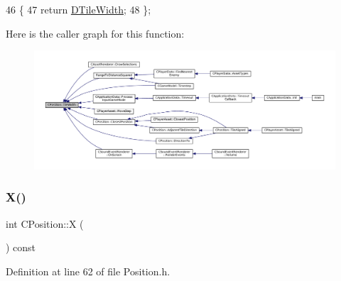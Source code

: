 \begin{DoxyCode}
46                               \{
47             \textcolor{keywordflow}{return} \hyperlink{classCPosition_ac17d12fb5d35fcf62d63bb42e8cf7ed6}{DTileWidth};  
48         \};
\end{DoxyCode}
Here is the caller graph for this function\+:\nopagebreak
\begin{figure}[H]
\begin{center}
\leavevmode
\includegraphics[width=350pt]{classCPosition_a27a7a8b9a5541da0aa8d97d785650fb8_icgraph}
\end{center}
\end{figure}
\hypertarget{classCPosition_a9a6b94d3b91df1492d166d9964c865fc}{}\label{classCPosition_a9a6b94d3b91df1492d166d9964c865fc} 
\subsubsection{\texorpdfstring{X()}{X()}\hspace{0.1cm}{\footnotesize\ttfamily [1/2]}}
{\footnotesize\ttfamily int C\+Position\+::X (\begin{DoxyParamCaption}{ }\end{DoxyParamCaption}) const\hspace{0.3cm}{\ttfamily [inline]}}



Definition at line 62 of file Position.\+h.


